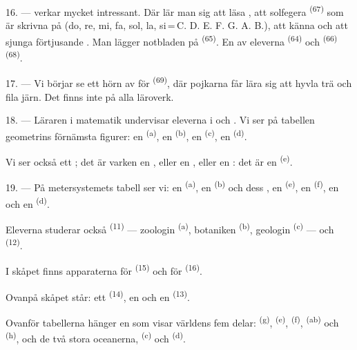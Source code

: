 16. ---  verkar mycket intressant. Där lär man sig att läsa
, att solfegera  \textsuperscript{(67)} som
är skrivna på  (do, re, mi, fa, sol, la, si\,=\,C. D. E. F. G. A. B.), att
känna  och att sjunga förtjusande
. Man lägger notbladen på 
\textsuperscript{(65)}. En av eleverna  \textsuperscript{(64)} och
 \textsuperscript{(66)}
 \textsuperscript{(68)}.

17. --- Vi börjar se ett hörn av  för 
\textsuperscript{(69)}, där pojkarna får lära sig att hyvla trä och fila järn. Det finns inte
på alla läroverk.

\VUsaut{5.0mm}
\VUsaut{3.6mm}

18. --- Läraren i matematik undervisar eleverna i  och
. Vi ser på tabellen geometrins förnämsta figurer: en 
\textsuperscript{(a)}, en  \textsuperscript{(b)}, en 
\textsuperscript{(c)}, en
 \textsuperscript{(d)}.

Vi ser också ett ; det är varken en , eller en
, eller en : det är en
 \textsuperscript{(e)}.

19. --- På metersystemets tabell ser vi: en  \textsuperscript{(a)}, en
 \textsuperscript{(b)} och dess
, en  \textsuperscript{(e)}, en 
\textsuperscript{(f)}, en  och en  \textsuperscript{(d)}.

Eleverna studerar också  \textsuperscript{(11)} --- zoologin
\textsuperscript{(a)}, botaniken \textsuperscript{(b)}, geologin \textsuperscript{(c)} --- och
 \textsuperscript{(12)}.

I skåpet finns apparaterna för  \textsuperscript{(15)} och för
 \textsuperscript{(16)}.

Ovanpå skåpet står: ett  \textsuperscript{(14)}, en  och en
 \textsuperscript{(13)}.

Ovanför tabellerna hänger en  som visar världens fem delar:
 \textsuperscript{(g)},  \textsuperscript{(e)},
 \textsuperscript{(f)}, 
\textsuperscript{(ab)} och  \textsuperscript{(h)}, och de två stora
oceanerna,  \textsuperscript{(c)} och
 \textsuperscript{(d)}.
\VUsaut{6.0mm}
\VUfilet{22mm}
